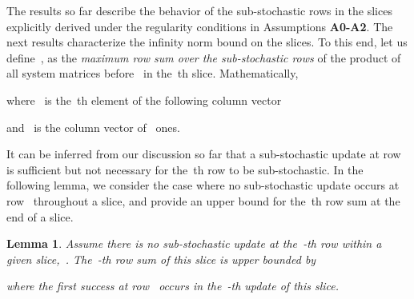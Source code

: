 \documentclass[draftclsnofoot, onecolumn, 12pt]{IEEEtran}
\newtheorem{lem}{Lemma}
\begin{document}
The results so far describe the behavior of the sub-stochastic rows in the slices explicitly derived under the regularity conditions in Assumptions {\bf A0-A2}. The next results characterize the infinity norm bound on the slices. To this end, let us define~, as the \emph{maximum row sum over the sub-stochastic rows} of the product of all system matrices before~ in the~th slice. Mathematically,

where~ is the~th element of the following column vector

and~ is the column vector of~ ones.

It can be inferred from our discussion so far that a sub-stochastic update at row~ is sufficient but not necessary for the~th row to be sub-stochastic. In the following lemma, we consider the case where no sub-stochastic update occurs at row~ throughout a slice, and provide an upper bound for the~th row sum at the end of a slice.
\begin{lem}\label{lm4}
Assume there is no sub-stochastic update at the~-th row within a given slice,~. The~-th row sum of this slice is upper bounded by

where the first success at row~ occurs in the~-th update of this slice.
\end{lem}
\end{document}
